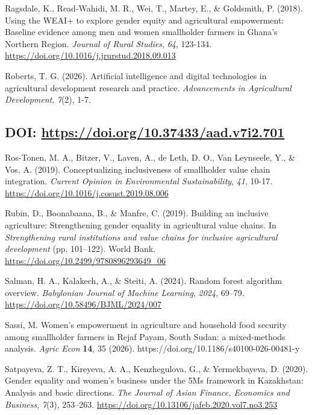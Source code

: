 \documentclass[
]{article}
\begin{document}
Ragsdale, K., Read-Wahidi, M. R., Wei, T., Martey, E., \& Goldsmith, P.
(2018). Using the WEAI+ to explore gender equity and agricultural
empowerment: Baseline evidence among men and women smallholder farmers
in Ghana's Northern Region. \emph{Journal of Rural Studies}, \emph{64},
123-134. \url{https://doi.org/10.1016/j.jrurstud.2018.09.013}

Roberts, T. G. (2026). Artificial intelligence and digital technologies
in agricultural development research and practice. \emph{Advancements in
Agricultural Development}, \emph{7}(2), 1-7.

\hypertarget{doi-httpsdoi.org10.37433aad.v7i2.701}{%
\subsection{\texorpdfstring{DOI:
\url{https://doi.org/10.37433/aad.v7i2.701}}{DOI: https://doi.org/10.37433/aad.v7i2.701}}\label{doi-httpsdoi.org10.37433aad.v7i2.701}}

Ros-Tonen, M. A., Bitzer, V., Laven, A., de Leth, D. O., Van Leynseele,
Y., \& Vos, A. (2019). Conceptualizing inclusiveness of smallholder
value chain integration. \emph{Current Opinion in Environmental
Sustainability}, \emph{41}, 10-17.
\url{https://doi.org/10.1016/j.cosust.2019.08.006}

Rubin, D., Boonabaana, B., \& Manfre, C. (2019). Building an inclusive
agriculture: Strengthening gender equality in agricultural value chains.
In \emph{Strengthening rural institutions and value chains for inclusive
agricultural development} (pp. 101--122). World Bank.
\url{https://doi.org/10.2499/9780896293649_06}

Salman, H. A., Kalakech, A., \& Steiti, A. (2024). Random forest
algorithm overview. \emph{Babylonian Journal of Machine Learning},
\emph{2024}, 69--79.
\href{https://doi.org/10.58496/BJML/2024/007.}{https://doi.org/10.58496/BJML/2024/007}

Sassi, M. Women's empowerment in agriculture and household food security
among smallholder farmers in Rejaf Payam, South Sudan: a mixed-methods
analysis. \emph{Agric Econ} \textbf{14}, 35 (2026).
https://doi.org/10.1186/s40100-026-00481-y

Satpayeva, Z. T., Kireyeva, A. A., Kenzhegulova, G., \& Yermekbayeva, D.
(2020). Gender equality and women's business under the 5Ms framework in
Kazakhstan: Analysis and basic directions. \emph{The Journal of Asian
Finance, Economics and Business}, \emph{7}(3), 253--263.
\url{https://doi.org/10.13106/jafeb.2020.vol7.no3.253}
\end{document}
